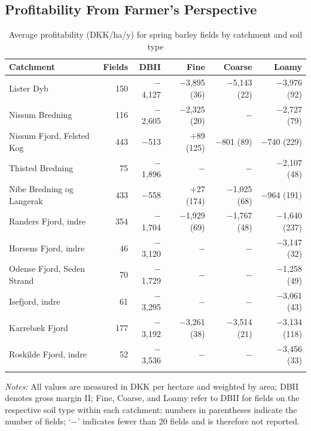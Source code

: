 \documentclass[12pt]{article}
\begin{document}
\subsection{Profitability From Farmer's Perspective}
\label{sec:app-profitability-farmer}

\begin{table}[H]
\centering
\small
\caption{Average profitability (DKK/ha/y) for spring barley fields by 
catchment and soil type}
\label{tab:dbii-vaarbyg-convcrops}
\begin{threeparttable}
\begin{tabular}{lrrrrr}
\toprule
\textbf{Catchment} & \textbf{Fields} & \textbf{DBII} &
\textbf{Fine} & \textbf{Coarse} & \textbf{Loamy} \\
\midrule\addlinespace
Lister Dyb                 & 150 & $-$4,127 & $-$3,895 (36)  & $-$5,143 (22)  & $-$3,976 (92)  \\
Nissum Bredning            & 116 & $-$2,605 & $-$2,325 (20)  & $-$            & $-$2,727 (79)  \\
Nissum Fjord, Felsted Kog  & 443 &   $-$513 &    $+$89 (125) &  $-$801 (89)   &  $-$740 (229)  \\
Thisted Bredning           &  75 & $-$1,896 & $-$            & $-$            & $-$2,107 (48)  \\
Nibe Bredning og Langerak  & 433 &   $-$558 &    $+$27 (174) & $-$1,025 (68)  &  $-$964 (191)  \\
Randers Fjord, indre       & 354 & $-$1,704 & $-$1,929 (69)  & $-$1,767 (48)  & $-$1,640 (237) \\
Horsens Fjord, indre       &  46 & $-$3,120 & $-$            & $-$            & $-$3,147 (32)  \\
Odense Fjord, Seden Strand &  70 & $-$1,729 & $-$            & $-$            & $-$1,258 (49)  \\
Isefjord, indre            &  61 & $-$3,295 & $-$            & $-$            & $-$3,061 (43)  \\
Karrebæk Fjord             & 177 & $-$3,192 & $-$3,261 (38)  & $-$3,514 (21)  & $-$3,134 (118) \\
Roskilde Fjord, indre      &  52 & $-$3,536 & $-$            & $-$            & $-$3,456 (33)  \\
\addlinespace\bottomrule
\end{tabular}
\begin{tablenotes}
\footnotesize
\item \textit{Notes:} All values are measured in DKK per hectare and 
weighted by area; DBII denotes gross margin II; Fine, Coarse, and 
Loamy refer to DBII for fields on the respective soil type within 
each catchment; numbers in parentheses indicate the number of fields; 
`$-$' indicates fewer than 20 fields and is therefore not reported.
\end{tablenotes}
\end{threeparttable}
\end{table}
\end{document}
